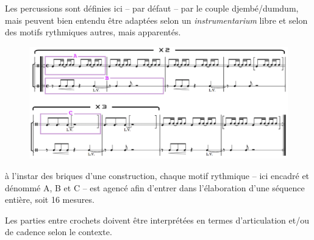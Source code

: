 Les percussions sont d\'{e}finies ici -- par d\'{e}faut -- par le couple djemb\'{e}/dumdum, mais peuvent bien entendu \^{e}tre adapt\'{e}es selon un \textit{instrumentarium} libre et selon des motifs rythmiques autres, mais apparent\'{e}s.

 
 \begin{figure}[H]
\begin{center}
\includegraphics[scale=0.68]{img/dlc5}
\end{center}
\end{figure}

\`{a} l'instar des briques d'une construction, chaque motif rythmique --  ici encadr\'{e} et d\'{e}nomm\'{e} A, B et C -- est agenc\'{e} afin d'entrer dans l'\'{e}laboration d'une s\'{e}quence enti\`{e}re, soit 16 mesures.

Les parties entre crochets doivent \^{e}tre interpr\'{e}t\'{e}es en termes d'articulation et/ou de cadence selon le contexte.

